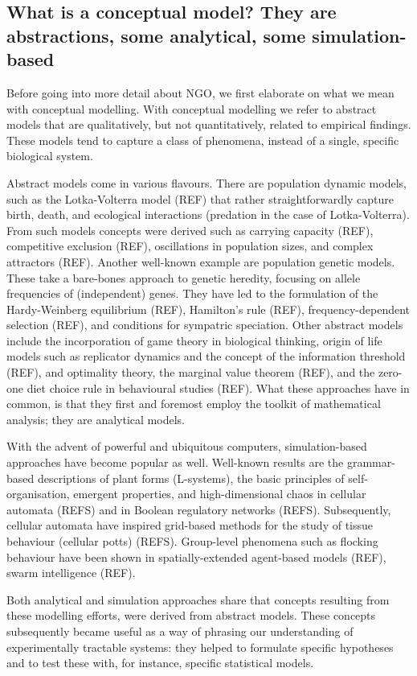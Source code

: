 \subsection{What is a conceptual model? They are abstractions, some analytical, some simulation-based}

Before going into more detail about NGO, we first elaborate on what we mean with conceptual modelling. With conceptual modelling we refer to abstract models that are qualitatively, but not quantitatively, related to empirical findings. These models tend to capture a class of phenomena, instead of a single, specific biological system.

Abstract models come in various flavours. There are population dynamic models, such as the Lotka-Volterra model (REF) that rather straightforwardly capture birth, death, and ecological interactions (predation in the case of Lotka-Volterra). From such models concepts were derived such as carrying capacity (REF), competitive exclusion (REF), oscillations in population sizes, and complex attractors (REF). Another well-known example are population genetic models. These take a bare-bones approach to genetic heredity, focusing on allele frequencies of (independent) genes. They have led to the formulation of the Hardy-Weinberg equilibrium (REF), Hamilton’s rule (REF), frequency-dependent selection (REF), and conditions for sympatric speciation. Other abstract models include the incorporation of game theory in biological thinking, origin of life models such as replicator dynamics and the concept of the information threshold (REF), and optimality theory, the marginal value theorem (REF), and the zero-one diet choice rule in behavioural studies (REF). What these approaches have in common, is that they first and foremost employ the toolkit of mathematical analysis; they are analytical models.

With the advent of powerful and ubiquitous computers, simulation-based approaches have become popular as well. Well-known results are the grammar-based descriptions of plant forms (L-systems), the basic principles of self-organisation, emergent properties, and high-dimensional chaos in cellular automata (REFS) and in Boolean regulatory networks (REFS). Subsequently, cellular automata have inspired grid-based methods for the study of tissue behaviour (cellular potts) (REFS). Group-level phenomena such as flocking behaviour have been shown in spatially-extended agent-based models (REF), swarm intelligence (REF).

Both analytical and simulation approaches share that concepts resulting from these modelling efforts, were derived from abstract models. These concepts subsequently became useful as a way of phrasing our understanding of experimentally tractable systems: they helped to formulate specific hypotheses and to test these with, for instance, specific statistical models.
  